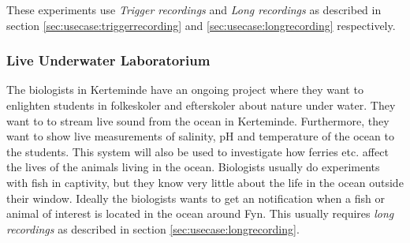 These experiments use \textit{Trigger recordings} and \textit{Long recordings} as described in section \ref{sec:usecase:triggerrecording} and \ref{sec:usecase:longrecording} respectively.

\subsubsection{Live Underwater Laboratorium}
The biologists in Kerteminde have an ongoing project where they want to enlighten students in folkeskoler and efterskoler about nature under water. They want to to stream live sound from the ocean in Kerteminde. Furthermore, they want to show live measurements of salinity, pH and temperature of the ocean to the students.
This system will also be used to investigate how ferries etc. affect the lives of the animals living in the ocean. Biologists usually do experiments with fish in captivity, but they know very little about the life in the ocean outside their window. Ideally the biologists wants to get an notification when a fish or animal of interest is located in the ocean around Fyn. This usually requires \textit{long recordings} as described in section \ref{sec:usecase:longrecording}.




